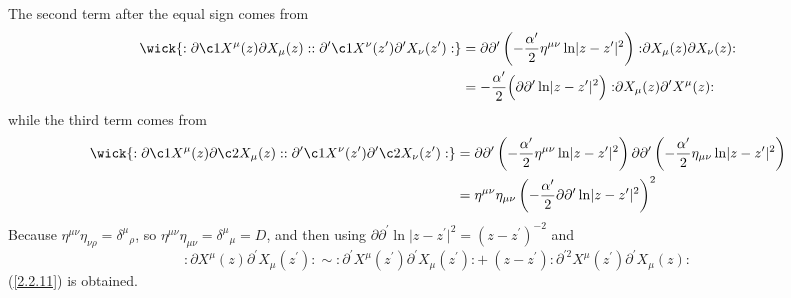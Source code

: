 \begin{tcolorbox}[breakable]
	\begin{remark}
		The second term after the equal sign comes from    
		\begin{align*}
			\wick{ : \partial \c1 {X}^{\mu}(z) \partial X_{\mu}(z) : : \partial^{\prime} \c1 {X}^{\nu} (z^{\prime}) \partial^{\prime} X_{\nu}(z^{\prime}) : }
			&=\partial \partial^{\prime}\left(-\frac{\alpha^{\prime}}{2} \eta^{\mu \nu}\ln \lvert z-z^{\prime}\rvert^{2}\right) 
			: \mathrel{\partial X_{\mu}(z) \partial X_{\nu}(z)}: \\
			&=-\frac{\alpha^{\prime}}{2} \Bigl(\partial \partial^{\prime} \ln \lvert z-z^{\prime}\rvert^{2}\Bigr)  
			: \mathrel{\partial X_{\mu}(z) \partial^{\prime} X^{\mu}(z)}:
		\end{align*}
		while the third term comes from
		\begin{align*}
		\wick{ : \partial \c1 {X}^{\mu}(z) \partial \c2 {X}_{\mu}(z) : : \partial^{\prime} \c1 {X}^{\nu}(z^{\prime}) \partial^{\prime} \c2 {X}_{\nu}(z^{\prime}) : } 
			&=\partial \partial^{\prime}\left(-\frac{\alpha^{\prime}}{2} \eta ^{\mu \nu} \ln \lvert z-z^{\prime}\rvert^{2}\right) 
			\partial \partial^{\prime}\left(-\frac{\alpha^{\prime}}{2} \eta_{\mu \nu}\ln \lvert z-z^{\prime}\rvert^{2}\right) \\
			&=\eta^{\mu \nu} \eta_{\mu \nu}\left(-\frac{\alpha^{\prime}}{2} \partial \partial^{\prime}\ln \lvert z- z^{\prime}\rvert ^{2}\right)^{2}
		\end{align*}
		Because $\eta^{\mu \nu} \eta_{\nu\rho}=\delta^{\mu}{}_{\rho}$, so $\eta^{\mu \nu} \eta_{\mu \nu}=\delta^{\mu}{ }_{\mu}=D$, and then using    
		$
		\partial \partial^{\prime} \ln \lvert z-z^{\prime }\vert 
		^{2}= (z-z^{\prime})^{-2}
		$
		and    
		\[
		:\mathrel{\partial X^\mu(z)\partial^\prime X_{\mu}(z^\prime)}:\sim :\mathrel{\partial^\prime X^\mu(z^\prime)\partial^\prime X_\mu(z^\prime)}: 
		+ \:(z-z^\prime):\mathrel{\partial^{\prime 2} X^\mu(z^\prime)\partial^\prime X_\mu(z)}:
		\]
		(\ref{2.2.11}) is obtained.    
	\end{remark}
\end{tcolorbox}


